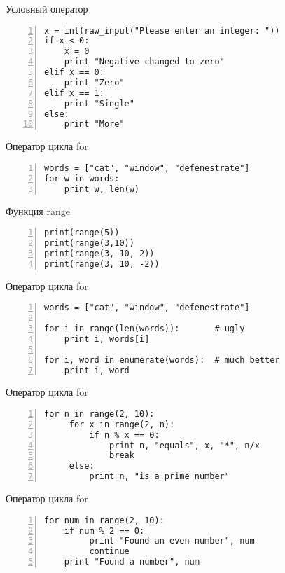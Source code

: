\documentclass[hyperref={pdftex,unicode}]{beamer}
\begin{document}
\begin{frame}[fragile]{Условный оператор}
  \begin{lstlisting}[numbers=left]
x = int(raw_input("Please enter an integer: "))
if x < 0:
    x = 0
    print "Negative changed to zero"
elif x == 0:
    print "Zero"
elif x == 1:
    print "Single"
else:
    print "More"
  \end{lstlisting}
\end{frame}

\begin{frame}[fragile]{Оператор цикла for}
  \begin{lstlisting}[numbers=left]
words = ["cat", "window", "defenestrate"]
for w in words:
    print w, len(w)
\end{lstlisting}
\end{frame}

\begin{frame}[fragile]{Функция range}
  \begin{lstlisting}[numbers=left]
print(range(5))
print(range(3,10))
print(range(3, 10, 2))
print(range(3, 10, -2))
\end{lstlisting}
\end{frame}


\begin{frame}[fragile]{Оператор цикла for}
  \begin{lstlisting}[numbers=left]
words = ["cat", "window", "defenestrate"]

for i in range(len(words)):       # ugly
    print i, words[i]

for i, word in enumerate(words):  # much better
    print i, word
\end{lstlisting}
\end{frame}


\begin{frame}[fragile]{Оператор цикла for}
  \begin{lstlisting}[numbers=left]
for n in range(2, 10):
     for x in range(2, n):
         if n % x == 0:
             print n, "equals", x, "*", n/x
             break
     else:
         print n, "is a prime number"
  \end{lstlisting}
\end{frame}

\begin{frame}[fragile]{Оператор цикла for}
  \begin{lstlisting}[numbers=left]
for num in range(2, 10):
    if num % 2 == 0:
         print "Found an even number", num
         continue
    print "Found a number", num
  \end{lstlisting}
\end{frame}
\end{document}
